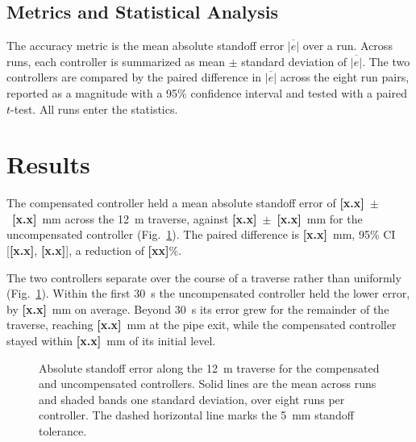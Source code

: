 \subsection{Metrics and Statistical Analysis}

The accuracy metric is the mean absolute standoff error $\overline{|e|}$ over a run.
Across runs, each controller is summarized as mean $\pm$ standard deviation of
$\overline{|e|}$. The two controllers are compared by the paired difference in
$\overline{|e|}$ across the eight run pairs, reported as a magnitude with a 95\%
confidence interval and tested with a paired $t$-test. All runs enter the statistics.

\section{Results}

The compensated controller held a mean absolute standoff error of
\textbf{[x.x]}~$\pm$~\textbf{[x.x]}~mm across the 12~m traverse, against
\textbf{[x.x]}~$\pm$~\textbf{[x.x]}~mm for the uncompensated controller
(Fig.~\ref{fig:error}). The paired difference is \textbf{[x.x]}~mm, 95\% CI
[\textbf{[x.x]}, \textbf{[x.x]}], a reduction of \textbf{[xx]}\%.

The two controllers separate over the course of a traverse rather than uniformly
(Fig.~\ref{fig:error}). Within the first 30~s the uncompensated controller held the
lower error, by \textbf{[x.x]}~mm on average. Beyond 30~s its error grew for the
remainder of the traverse, reaching \textbf{[x.x]}~mm at the pipe exit, while the
compensated controller stayed within \textbf{[x.x]}~mm of its initial level.

\begin{figure}[t]
\caption{Absolute standoff error along the 12~m traverse for the compensated and
uncompensated controllers. Solid lines are the mean across runs and shaded bands one
standard deviation, over eight runs per controller. The dashed horizontal line marks the
5~mm standoff tolerance.}
\label{fig:error}
\end{figure}

